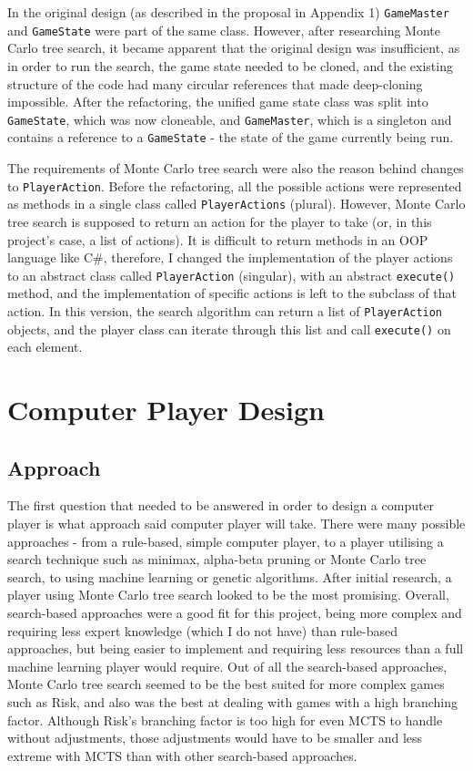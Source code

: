 In the original design (as described in the proposal in Appendix 1) \texttt{GameMaster} and \texttt{GameState} were part of the same class. However, after researching Monte Carlo tree search, it became apparent that the original design was insufficient, as in order to run the search, the game state needed to be cloned, and the existing structure of the code had many circular references that made deep-cloning impossible. After the refactoring, the unified game state class was split into \texttt{GameState}, which was now cloneable, and \texttt{GameMaster}, which is a singleton and contains a reference to a \texttt{GameState} - the state of the game currently being run.

The requirements of Monte Carlo tree search were also the reason behind changes to \texttt{PlayerAction}. Before the refactoring, all the possible actions were represented as methods in a single class called \texttt{PlayerActions} (plural). However, Monte Carlo tree search is supposed to return an action for the player to take (or, in this project's case, a list of actions). It is difficult to return methods in an OOP language like C\#, therefore, I changed the implementation of the player actions to an abstract class called \texttt{PlayerAction} (singular), with an abstract \texttt{execute()} method, and the implementation of specific actions is left to the subclass of that action. In this version, the search algorithm can return a list of \texttt{PlayerAction} objects, and the player class can iterate through this list and call \texttt{execute()} on each element.

\section{Computer Player Design}
\label{computerPlayerDesign}
\subsection{Approach}
The first question that needed to be answered in order to design a computer player is what approach said computer player will take. There were many possible approaches - from a rule-based, simple computer player, to a player utilising a search technique such as minimax, alpha-beta pruning or Monte Carlo tree search, to using machine learning or genetic algorithms. After initial research, a player using Monte Carlo tree search looked to be the most promising. Overall, search-based approaches were a good fit for this project, being more complex and requiring less expert knowledge (which I do not have) than rule-based approaches, but being easier to implement and requiring less resources than a full machine learning player would require. Out of all the search-based approaches, Monte Carlo tree search seemed to be the best suited for more complex games such as Risk, and also was the best at dealing with games with a high branching factor. Although Risk's branching factor is too high for even MCTS to handle without adjustments, those adjustments would have to be smaller and less extreme with MCTS than with other search-based approaches.

